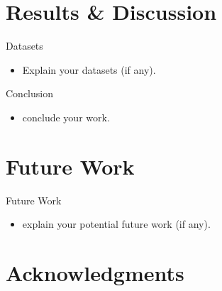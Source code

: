 \documentclass[xcolor=table]{beamer}
\begin{document}
\section{Results \& Discussion}
\begin{frame}{Datasets}
    \begin{itemize}
        \item Explain your datasets (if any).
    \end{itemize}
\end{frame}
\begin{frame}{Conclusion}
    \begin{itemize}
        \item conclude your work.
    \end{itemize}
    \begin{minipage}[c]{1\linewidth}
    \end{minipage}
\end{frame}
\section{Future Work}
\begin{frame}{Future Work}
    \begin{itemize}
        \item explain your potential future work (if any).
    \end{itemize}
    \begin{minipage}[c]{1\linewidth}
    \end{minipage}
\end{frame}
\section{Acknowledgments}
\end{document}
